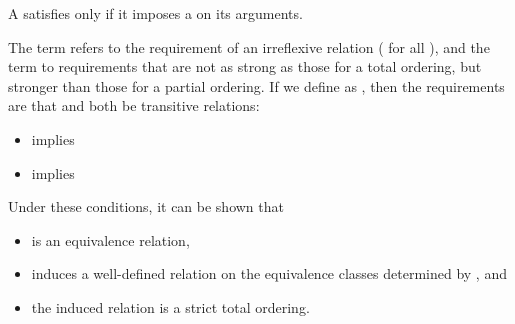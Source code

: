\begin{itemdescr}
\pnum
A  satisfies  only if
it imposes a  on its arguments.

\pnum
The term
refers to the
requirement of an irreflexive relation ( for all ),
and the term
to requirements that are not as strong as
those for a total ordering,
but stronger than those for a partial
ordering.
If we define
as
,
then the requirements are that
and
both be transitive relations:

\begin{itemize}
\item
{}
implies
\item
{}
implies
\end{itemize}

\pnum
\begin{note}
Under these conditions, it can be shown that
\begin{itemize}
\item
{}
is an equivalence relation,
\item
{}
induces a well-defined relation on the equivalence
classes determined by
, and
\item
the induced relation is a strict total ordering.
\end{itemize}
\end{note}
\end{itemdescr}
